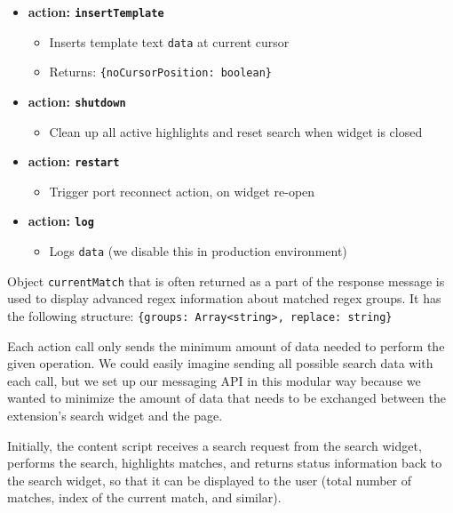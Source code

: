 \documentclass[bsc,frontabs,twoside,singlespacing,parskip,deptreport]{infthesis}
\providecommand{\tightlist}{%
  \setlength{\itemsep}{0pt}\setlength{\parskip}{0pt}}
\begin{document}
\begin{itemize}
\item\textbf{action: \texttt{insertTemplate}}

\begin{itemize}
\tightlist
\item
  Inserts template text \texttt{data} at current cursor
\item
  Returns: \texttt{\{noCursorPosition:\ boolean\}}
\end{itemize}

\item\textbf{action: \texttt{shutdown}}

\begin{itemize}
\tightlist
\item
  Clean up all active highlights and reset search when widget is closed
\end{itemize}

\item\textbf{action: \texttt{restart}}

\begin{itemize}
\tightlist
\item
  Trigger port reconnect action, on widget re-open
\end{itemize}

\item\textbf{action: \texttt{log}}

\begin{itemize}
\tightlist
\item
  Logs \texttt{data} (we disable this in production environment) 
\end{itemize}
\end{itemize}

Object \texttt{currentMatch} that is often returned as a part of the response message is used to display advanced regex information about matched regex groups. It has the following structure:
\texttt{\{groups:\ Array\textless{}string\textgreater{},\ replace:\ string\}}

Each action call only sends the minimum amount of data needed to perform the given operation. We could easily imagine sending all possible search data with each call, but we set up our messaging API in this modular way because we wanted to minimize the amount of data that needs to be exchanged between the extension's search widget and the page.

Initially, the content script receives a search request from the search widget, performs the search, highlights matches, and returns status information back to the search widget, so that it can be displayed to the user (total number of matches, index of the current match, and similar).
\end{document}
